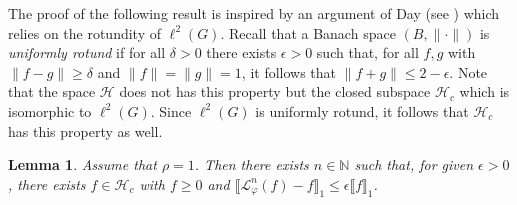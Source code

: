 \documentclass[10pt]{article}
\newtheorem{lemma}[theorem]{Lemma}
\theoremstyle{mystyle}
\newcommand{\N}{\mathbb{N}}
\newcommand{\cL}{\mathcal{L}}
\newcommand{\cH}{\mathcal{H}}
\newcommand{\1}{\mathbf{1}}
\begin{document}
The proof of the following result is inspired by an argument of Day (see \cite[Lemma 4]{Day:1964}) which relies on the rotundity of $\ell^2(G)$.  
Recall that a Banach space $(B,\|\cdot \|)$ is \emph{uniformly rotund} if for all $\delta>0$ there exists $\epsilon>0$ such that, for all $f,g$ with $\|f-g\| \geq \delta$ and $\|f\|=\|g\|=1$, it follows that $\|f+g\| \leq 2- \epsilon$. Note that the space $\cH$ does not has this property but the closed subspace $\cH_c$ which is isomorphic to  $\ell^2(G)$. Since $\ell^2(G)$ is uniformly rotund, it follows that  $\cH_c$ has this property as well.    

\begin{lemma}\label{lem:constant_almost_eigenfunction}
 Assume that $\rho=1$. Then there exists $n \in \N$ such that, for given $\epsilon >0$, there exists $f \in \cH_c$ with $f\geq 0$ and $\llbracket \cL_\varphi^n(f) - f \rrbracket_1  \leq \epsilon \llbracket f \rrbracket_1$.
\end{lemma}
\end{document}
